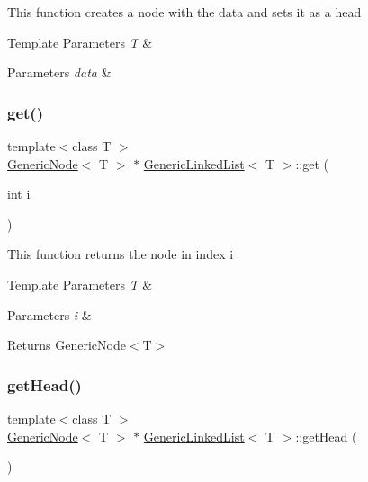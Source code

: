 This function creates a node with the data and sets it as a head 
\begin{DoxyTemplParams}{Template Parameters}
{\em T} & \\
\hline
\end{DoxyTemplParams}

\begin{DoxyParams}{Parameters}
{\em data} & \\
\hline
\end{DoxyParams}
\mbox{\label{class_generic_linked_list_a59b8bfebf18e1d167967ecfbe8172049}} 
\subsubsection{\texorpdfstring{get()}{get()}}
{\footnotesize\ttfamily template$<$class T $>$ \\
\mbox{\hyperlink{class_generic_node}{Generic\+Node}}$<$ T $>$ $\ast$ \mbox{\hyperlink{class_generic_linked_list}{Generic\+Linked\+List}}$<$ T $>$\+::get (\begin{DoxyParamCaption}\item[{int}]{i }\end{DoxyParamCaption})}

This function returns the node in index i 
\begin{DoxyTemplParams}{Template Parameters}
{\em T} & \\
\hline
\end{DoxyTemplParams}

\begin{DoxyParams}{Parameters}
{\em i} & \\
\hline
\end{DoxyParams}
\begin{DoxyReturn}{Returns}
Generic\+Node$<$\+T$>$ 
\end{DoxyReturn}
\mbox{\label{class_generic_linked_list_a8b21f9bbec56f257569e2c0eebee14d3}} 
\subsubsection{\texorpdfstring{getHead()}{getHead()}}
{\footnotesize\ttfamily template$<$class T $>$ \\
\mbox{\hyperlink{class_generic_node}{Generic\+Node}}$<$ T $>$ $\ast$ \mbox{\hyperlink{class_generic_linked_list}{Generic\+Linked\+List}}$<$ T $>$\+::get\+Head (\begin{DoxyParamCaption}{ }\end{DoxyParamCaption})}


